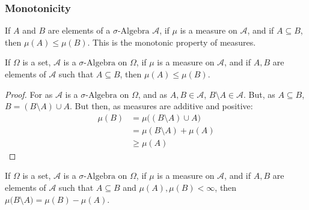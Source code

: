 \documentclass[crop=false,class=book,oneside]{standalone}
\begin{document}
            \subsubsection{Monotonicity}
                If $A$ and $B$ are elements of a $\sigma\text{-Algebra}$
                $\mathcal{A}$, if $\mu$ is a measure on
                $\mathcal{A}$, and if $A\subseteq{B}$, then
                $\mu(A)\leq\mu(B)$. This is the monotonic property
                of measures.
                \begin{theorem}
                    If $\Omega$ is a set, $\mathcal{A}$ is a
                    $\sigma\text{-Algebra}$ on $\Omega$, if
                    $\mu$ is a measure on $\mathcal{A}$, and if
                    $A,B$ are elements of $\mathcal{A}$ such that
                    $A\subseteq{B}$, then $\mu(A)\leq\mu(B)$.
                \end{theorem}
                \begin{proof}
                    For as $\mathcal{A}$ is a $\sigma\text{-Algebra}$
                    on $\Omega$, and as $A,B\in\mathcal{A}$,
                    $B\setminus{A}\in\mathcal{A}$. But, as
                    $A\subseteq{B}$, $B=(B\setminus{A})\cup{A}$.
                    But then, as measures are additive and positive:
                    \begin{align}
                        \mu(B)&=\mu\big((B\setminus{A})\cup{A}\big)\\
                        &=\mu(B\setminus{A})+\mu(A)\\
                        &\geq\mu(A)
                    \end{align}
                \end{proof}
                \begin{theorem}
                    If $\Omega$ is a set, $\mathcal{A}$ is a
                    $\sigma\text{-Algebra}$ on $\Omega$, if
                    $\mu$ is a measure on $\mathcal{A}$, and if
                    $A,B$ are elements of $\mathcal{A}$ such that
                    $A\subseteq{B}$ and $\mu(A),\mu(B)<\infty$,
                    then $\mu\big(B\setminus{A}\big)=\mu(B)-\mu(A)$.
                \end{theorem}
\end{document}
